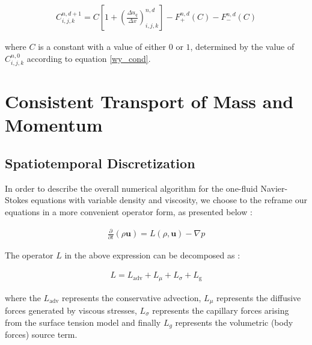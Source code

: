 \begin{align}
C_{i,j,k}^{n,d+1} =  C \left[1 + \left(\frac{\Delta u_q}{\Delta x}\right)^{n,d}_{i,j,k} \right] - F_{+}^{n,d}\left(C \right) - F_{-}^{n,d}\left(C \right)   
\label{wy_discrete}
\end{align}

where $C$ is a constant with a value of either $0$ or $1$, determined by the value of $C_{i,j,k}^{n,0}$ according to equation \ref{wy_cond}.  


\section{Consistent Transport of Mass and Momentum}



\subsection*{Spatiotemporal Discretization}

In order to describe the overall numerical algorithm for the one-fluid Navier-Stokes equations with variable density and viscosity, we choose to the reframe our equations in a more convenient operator form, as presented below : 

\begin{align}
   \frac{\partial}{\partial t} \left( \rho \boldsymbol{u} \right) = L\left( \rho,\boldsymbol{u} \right) - \nabla p
\end{align}

The operator $L$ in the above expression can be decomposed as : 

\begin{align}
	L = L_{\textrm{adv}} + L_{\mu} + L_{\sigma} + L_{\textrm{g}} 
   \label{opr}
\end{align}

where the $L_{\textrm{adv}}$ represents the conservative advection, 
$L_{\mu}$ represents the diffusive forces generated by viscous stresses,
$L_{\sigma}$ represents the capillary forces arising from the surface tension model
and finally $L_{g}$ represents the volumetric (body forces) source term. 


